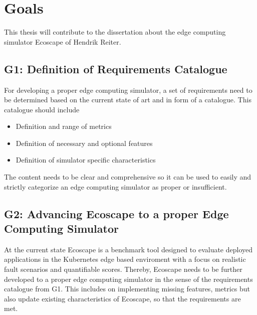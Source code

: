 \chapter{Goals}
This thesis will contribute to the dissertation about the edge computing simulator Ecoscape of Hendrik Reiter.

\section{G1: Definition of Requirements Catalogue}\label{goal-def-of-req-catalogue}
For developing a proper edge computing simulator, a set of requirements need to be determined based on the current state of art and in form of a catalogue.
This catalogue should include
\begin{itemize}
  \item Definition and range of metrics
  \item Definition of necessary and optional features
  \item Definition of simulator specific characteristics
\end{itemize}
The content needs to be clear and comprehensive so it can be used to easily and strictly categorize an edge computing simulator as proper or insufficient.

\section{G2: Advancing Ecoscape to a proper Edge Computing Simulator}
At the current state Ecoscape is a benchmark tool designed to evaluate deployed applications in the Kubernetes edge based enviroment with a focus on realistic fault scenarios and quantifiable scores.
Thereby, Ecoscape needs to be further developed to a proper edge computing simulator in the sense of the requirements catalogue from G1.
This includes on implementing missing features, metrics but also update existing characteristics of Ecoscape, so that the requirements are met.